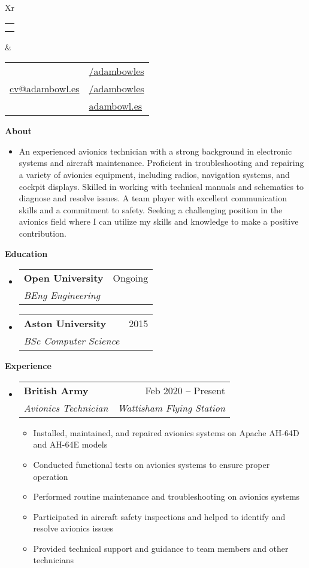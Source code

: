 \documentclass[a4paper,12pt]{article}[leftmargin=*]
\makeatletter
\def \fullname {Adam Bowles}
\def \subtitle {}
\def \linkedinicon {\faLinkedin}
\def \linkedinlink {https://linkedin.com/in/adambowles/}
\def \linkedintext {/adambowles}
\def \phoneicon {\faPhone}
\def \phonetext {07584 356713}
\def \emailicon {\faEnvelope}
\def \emaillink {mailto:cv@adambowl.es}
\def \emailtext {cv@adambowl.es}
\def \githubicon {\faGithub}
\def \githublink {https://github.com/adambowles}
\def \githubtext {/adambowles}
\def \websiteicon {\faGlobe}
\def \websitelink {https://adambowl.es/}
\def \websitetext {adambowl.es}
\def \headertype {\doublecol} %
\def \entryspacing {-0pt}
\def \linkedin {\linkedinicon \hspace{3pt}\href{\linkedinlink}{\linkedintext}}
\def \phone {\phoneicon \hspace{3pt}{ \phonetext}}
\def \email {\emailicon \hspace{3pt}\href{\emaillink}{\emailtext}}
\def \github {\githubicon \hspace{3pt}\href{\githublink}{\githubtext}}
\def \website {\websiteicon \hspace{3pt}\href{\websitelink}{\websitetext}}
\renewcommand{\section}[2]{\vspace{5pt}
  \colorbox{secondary}{\color{white}\raggedbottom\normalsize\textbf{{#1}{\hspace{7pt}#2}}}
}
\newcommand{\resumeEntryStart}{\begin{itemize}[leftmargin=2.5mm]}
\newcommand{\resumeEntryEnd}{\end{itemize}\vspace{\entryspacing}}
\newcommand{\resumeItemListStart}{\begin{itemize}[leftmargin=4.5mm]}
\newcommand{\resumeItemListEnd}{\end{itemize}}
\newcommand{\resumeItem}[1]{
  \item\small{
    {#1 \vspace{-2pt}}
  }
}
\newcommand{\resumeEntryBio}[1]{
  \item[]\small{
    {#1}
  }
}
\newcommand{\resumeEntryTSDL}[4]{
  \vspace{-1pt}\item[]
    \begin{tabularx}{0.97\textwidth}{X@{\hspace{60pt}}r}
      \textbf{\color{primary}#1} & {\firabook\color{accent}\small#2} \\
      \textit{\color{accent}\small#3} & \textit{\color{accent}\small#4} \\
    \end{tabularx}\vspace{-6pt}
}
\newcommand{\doublecol}[6]{
  \begin{tabularx}{\textwidth}{Xr}
    {
      \begin{tabular}[c]{l}
        \fontsize{35}{45}\selectfont{\color{primary}{{\textbf{\fullname}}}} \\
        {\textit{\subtitle}} %
      \end{tabular}
    } & {
      \begin{tabular}[c]{l@{\hspace{1.5em}}l}
        {\small#4} & {\small#1} \\
        {\small#5} & {\small#2} \\
        {\small#6} & {\small#3}
      \end{tabular}
    }
  \end{tabularx}
}
\newcommand{\singlecol}[6]{
  \begin{tabularx}{\textwidth}{Xr}
    {
      \begin{tabular}[b]{l}
        \fontsize{35}{45}\selectfont{\color{primary}{{\textbf{\fullname}}}} \\
        {\textit{\subtitle}} %
      \end{tabular}
    } & {
      \begin{tabular}[c]{l}
        {\small#1} \\
        {\small#2} \\
        {\small#3} \\
        {\small#4} \\
        {\small#5} \\
        {\small#6}
      \end{tabular}
    }
  \end{tabularx}
}
\makeatother
\begin{document}


\headertype{\linkedin}{\github}{\website}{\phone}{\email}{} %
\vspace{-10pt} %

\section{\faUser}{About}

  \resumeEntryStart
    \resumeEntryBio{An experienced avionics technician with a strong background in electronic systems and aircraft maintenance. Proficient in troubleshooting and repairing a variety of avionics equipment, including radios, navigation systems, and cockpit displays. Skilled in working with technical manuals and schematics to diagnose and resolve issues. A team player with excellent communication skills and a commitment to safety. Seeking a challenging position in the avionics field where I can utilize my skills and knowledge to make a positive contribution.}
 \resumeEntryEnd

\section{\faGraduationCap}{Education}

  \resumeEntryStart
    \resumeEntryTSDL
      {Open University}{Ongoing}
      {BEng Engineering}{}
    \resumeEntryTSDL
      {Aston University}{2015}
      {BSc Computer Science}{}
  \resumeEntryEnd

\section{\faWrench}{Experience}

  \resumeEntryStart
    \resumeEntryTSDL
      {British Army}{Feb 2020 -- Present}
      {Avionics Technician}{Wattisham Flying Station}
    \resumeItemListStart
      \resumeItem {Installed, maintained, and repaired avionics systems on Apache AH-64D and AH-64E models}
      \resumeItem {Conducted functional tests on avionics systems to ensure proper operation}
      \resumeItem {Performed routine maintenance and troubleshooting on avionics systems}
      \resumeItem {Participated in aircraft safety inspections and helped to identify and resolve avionics issues}
      \resumeItem {Provided technical support and guidance to team members and other technicians}
    \resumeItemListEnd
  \resumeEntryEnd
\end{document}
